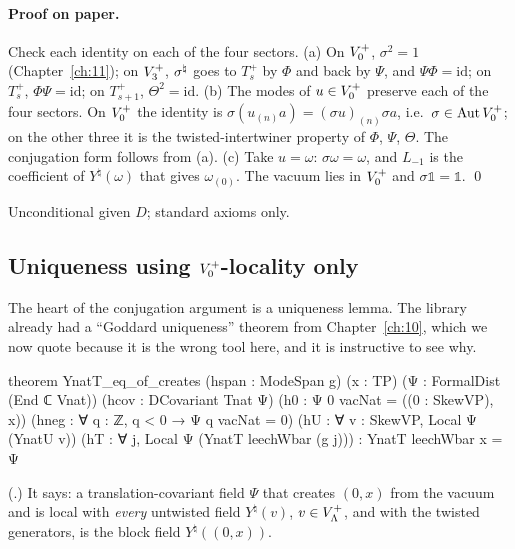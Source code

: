 \paragraph{Proof on paper.}  Check each identity on each of the four sectors.  (a) On $V_0^{+}$,
$\sigma^2=1$ (Chapter~\ref{ch:11}); on $V_3^{+}$, $\sigma^{\natural}$ goes to $T_s^+$ by $\Phi$ and back by $\Psi$,
and $\Psi\Phi=\mathrm{id}$; on $T_s^+$, $\Phi\Psi=\mathrm{id}$; on $T_{s+1}^+$, $\Theta^2=\mathrm{id}$.
(b) The modes of $u\in V_0^{+}$ preserve each of the four sectors.  On $V_0^{+}$ the identity is
$\sigma(u_{(n)}a)=(\sigma u)_{(n)}\sigma a$, i.e.\ $\sigma\in\operatorname{Aut}V_0^{+}$; on the other three it is the
twisted-intertwiner property of $\Phi$, $\Psi$, $\Theta$.  The conjugation form follows from (a).
(c) Take $u=\omega$: $\sigma\omega=\omega$, and $L_{-1}$ is the coefficient of $Y^\natural(\omega)$ that
gives $\omega_{(0)}$.  The vacuum lies in $V_0^{+}$ and $\sigma\mathbb 1=\mathbb 1$. \qed

\begin{status}Unconditional given $D$; standard axioms only.\end{status}

\subsection{\texorpdfstring{Uniqueness using $V_0^{+}$-locality only}{Uniqueness using V0+-locality only}}

The heart of the conjugation argument is a uniqueness lemma.  The library already had a
``Goddard uniqueness'' theorem from Chapter~\ref{ch:10}, which we now quote because it is the wrong
tool here, and it is instructive to see why.

\begin{leancode}
theorem YnatT_eq_of_creates (hspan : ModeSpan g) (x : TP) (Ψ : FormalDist (End ℂ Vnat))
    (hcov : DCovariant Tnat Ψ) (h0 : Ψ 0 vacNat = ((0 : SkewVP), x))
    (hneg : ∀ q : ℤ, q < 0 → Ψ q vacNat = 0) (hU : ∀ v : SkewVP, Local Ψ (YnatU v))
    (hT : ∀ j, Local Ψ (YnatT leechWbar (g j))) : YnatT leechWbar x = Ψ
\end{leancode}
(.)  It says: a translation-covariant field $\Psi$ that creates
$(0,x)$ from the vacuum and is local with \emph{every} untwisted field $Y^\natural(v)$,
$v\in V_{\Lambda}^+$, and with the twisted generators, is the block field $Y^\natural((0,x))$.

